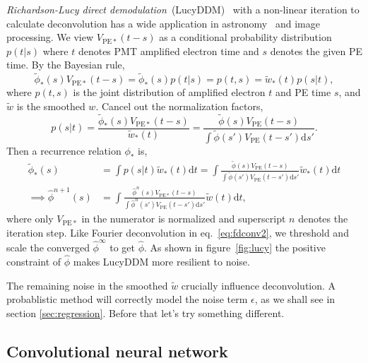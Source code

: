 \textit{Richardson-Lucy direct demodulation}~(LucyDDM)~\cite{lucy_iterative_1974} with a non-linear iteration to calculate deconvolution has a wide application in astronomy~\cite{li_richardson-lucy_2019} and image processing. We view $V_{\mathrm{PE}*}(t-s)$ as a conditional probability distribution $p(t|s)$ where $t$ denotes PMT amplified electron time and $s$ denotes the given PE time. By the Bayesian rule,
\begin{equation}
  \label{eq:lucy}
  \tilde{\phi}_*(s) V_{\mathrm{PE}*}(t-s) = \tilde{\phi}_*(s)p(t|s) = p(t,s) = \tilde{w}_*(t)p(s|t),
\end{equation}
where $p(t, s)$ is the joint distribution of amplified electron $t$ and PE time $s$, and $\tilde{w}$ is the smoothed $w$.  Cancel out the normalization factors,
\begin{equation}
  \label{eq:ptt}
  p(s|t) = \frac{\tilde{\phi}_*(s) V_{\mathrm{PE}*}(t-s)}{\tilde{w}_*(t)} = \frac{\tilde{\phi}(s) V_{\mathrm{PE}}(t-s)}{\int\tilde{\phi}(s') V_{\mathrm{PE}}(t-s')\mathrm{d}s'}.
\end{equation}
Then a recurrence relation $\phi_*$ is,
\begin{equation}
  \label{eq:iter}
  \begin{aligned}
    \tilde{\phi}_*(s) & = \int p(s|t) \tilde{w}_*(t)\mathrm{d}t = \int \frac{\tilde{\phi}(s) V_{\mathrm{PE}}(t-s)}{\int\tilde{\phi}(s') V_{\mathrm{PE}}(t-s')\mathrm{d}s'} \tilde{w}_*(t) \mathrm{d}t \\
    \implies \hat{\phi}^{n+1}(s) & = \int \frac{\hat{\phi}^n(s) V_{\mathrm{PE}*}(t-s)}{\int\hat{\phi}^n(s') V_{\mathrm{PE}}(t-s')\mathrm{d}s'} \tilde{w}(t) \mathrm{d}t,
  \end{aligned}
\end{equation}
where only $V_{\mathrm{PE}*}$ in the numerator is normalized and superscript $n$ denotes the iteration step.
Like Fourier deconvolution in eq.~\eqref{eq:fdconv2}, we threshold and scale the converged $\hat{\phi}^\infty$ to get $\hat{\phi}$.  As shown in figure~\ref{fig:lucy} the positive constraint of $\hat{\phi}$ makes LucyDDM more resilient to noise.

The remaining noise in the smoothed $\tilde{w}$ crucially influence deconvolution.  A probablistic method will correctly model the noise term $\epsilon$, as we shall see in section \ref{sec:regression}.  Before that let's try something different.

\subsection{Convolutional neural network}

